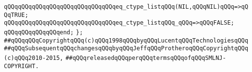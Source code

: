 \verb|qQQqqQQqqQQqqQQqqQQqqQQqqQQqqQQqeq_ctype_listqQQq(NIL,qQQqNIL)qQQq=>qQQqTRUE;|\newline
\verb|qQQqqQQqqQQqqQQqqQQqqQQqqQQqqQQqeq_ctype_listqQQq_qQQq=>qQQqFALSE;|\newline
\verb|qQQqqQQqqQQqqQQqend;|\newline
\newline
\verb|};|\newline
\newline
\newline
\verb|##qQQqqQQqCopyrightqQQq(c)qQQq1998qQQqbyqQQqLucentqQQqTechnologiesqQQq|\newline
\verb|##qQQqSubsequentqQQqchangesqQQqbyqQQqJeffqQQqProtheroqQQqCopyrightqQQq(c)qQQq2010-2015,|\newline
\verb|##qQQqreleasedqQQqperqQQqtermsqQQqofqQQqSMLNJ-COPYRIGHT.|\newline

